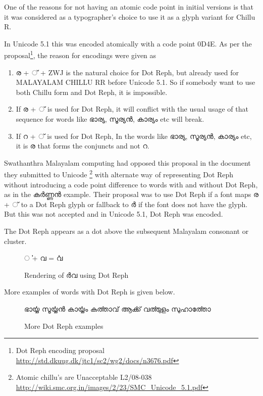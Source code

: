 One of the reasons for not having an atomic code point in initial versions is that
it was considered as a typographer's choice to use it as a glyph variant for Chillu R.

In Unicode 5.1 this was encoded atomically with a code point 0D4E.
As per the proposal\footnote{ Dot Reph encoding proposal \url{http://std.dkuug.dk/jtc1/sc2/wg2/docs/n3676.pdf}},
the reason for encodings were given as

\begin{enumerate}
\item  {\malayalam ര + ് + ZWJ} is the natural choice for Dot Reph, but already used
for MALAYALAM CHILLU RR before Unicode 5.1. So if somebody want to use both
Chillu form and Dot Reph, it is impossible.
\item If {\malayalam ര + ് } is used for Dot Reph, it will conflict with the usual
usage of that sequence for words like {\malayalam ഭാര്യ, സൂര്യന്‍, കാര്യം } etc will break.
\item If {\malayalam റ + ് } is used for Dot Reph, In the words like
{\malayalam ഭാര്യ, സൂര്യന്‍, കാര്യം } etc, it is ര  that forms the conjuncts and not  {\malayalam റ}.
\end{enumerate}

Swathanthra Malayalam computing had opposed this proposal in the document they
submitted to Unicode \footnote{Atomic chillu's are Unacceptable L2/08-038 \url{http://wiki.smc.org.in/images/2/23/SMC_Unicode_5.1.pdf}}
with alternate way of representing Dot Reph without introducing a code point
difference to words with and without Dot Reph, as in the {\malayalam കര്‍ണ്ണന്‍}
example. Their proposal was to use Dot Reph if a font maps {\malayalam ര + ്  }
to a Dot Reph glyph or fallback to {\malayalam ര്‍} if the font does not have
the glyph. But this was not accepted and in Unicode 5.1, Dot Reph was encoded.

The Dot Reph appears as a dot above the subsequent Malayalam consonant or cluster.

\begin{figure}[h!]
  \centering
  {\meera\textexample ൎ + വ  = ൎവ }\\
  \caption{Rendering of {\malayalam ര്‍വ } using Dot Reph }
\end{figure}

More examples of words with Dot Reph is given below.

\begin{figure}[h!]
  \centering
  {\meera ഭാൎയ്യ സൂൎയ്യന്‍ കാൎയ്യം  കൎത്താവ്  ആൎക്ക്  വൎത്തുളം  സുഹാൎത്തോ}\\
  \caption{More Dot Reph examples}
\end{figure}

